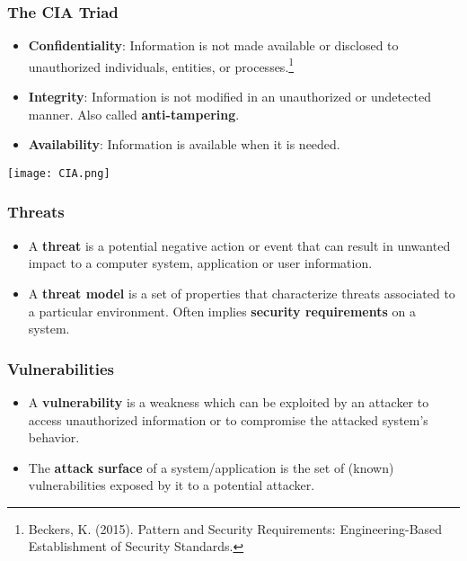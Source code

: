 \documentclass[
hyperref={pdfpagelabels=false}
,xcolor=table
]
{beamer}
\begin{document}
\begin{frame}
  \frametitle{The CIA Triad}
  \begin{itemize}
  \item \textbf{Confidentiality}: Information is not made available or
    disclosed to unauthorized individuals, entities, or
    processes.\footnote{\tiny Beckers, K. (2015). Pattern and Security
      Requirements: Engineering-Based Establishment of Security
      Standards.}
  \item \textbf{Integrity}: Information is not modified in an unauthorized or
    undetected manner. Also called \textbf{anti-tampering}.
  \item \textbf{Availability}: Information is available when it is needed.
  \end{itemize}

  \begin{center}
    \texttt{[image: CIA.png]}
  \end{center}
  
\end{frame}


\begin{frame}
  \frametitle{Threats}
  \begin{itemize}
  \item A \textbf{threat} is a potential negative action or event that can
    result in unwanted impact to a computer system, application or
    user information.
  \item A \textbf{threat model} is a set of properties that characterize
    threats associated to a particular environment. Often implies
    \textbf{security requirements} on a system. 
  \end{itemize}
\end{frame}


\begin{frame}
  \frametitle{Vulnerabilities}
  \begin{itemize}
  \item A \textbf{vulnerability} is a weakness which can be exploited by an
    attacker to access unauthorized information or to compromise the
    attacked system's behavior. 
  \item The \textbf{attack surface} of a system/application is the set of
    (known) vulnerabilities exposed by it to a potential attacker.
  \end{itemize}
\end{frame}
\end{document}
